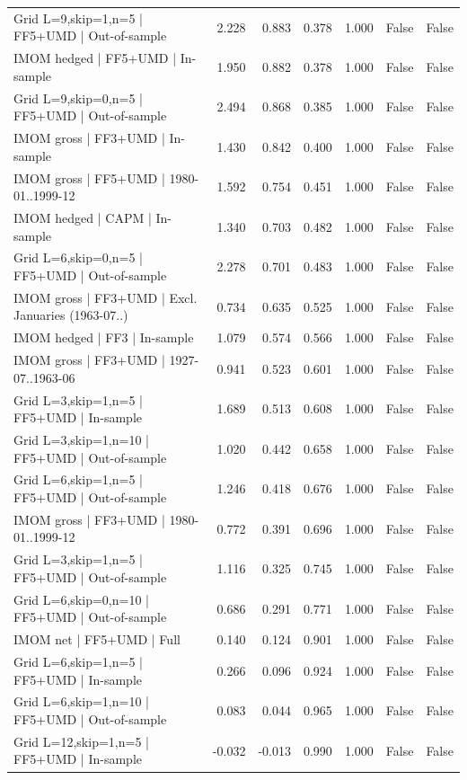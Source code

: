 \begin{tabular}{lrrrrrr}
Grid L=9,skip=1,n=5 | FF5+UMD | Out-of-sample & 2.228 & 0.883 & 0.378 & 1.000 & False & False \\
IMOM hedged | FF5+UMD | In-sample & 1.950 & 0.882 & 0.378 & 1.000 & False & False \\
Grid L=9,skip=0,n=5 | FF5+UMD | Out-of-sample & 2.494 & 0.868 & 0.385 & 1.000 & False & False \\
IMOM gross | FF3+UMD | In-sample & 1.430 & 0.842 & 0.400 & 1.000 & False & False \\
IMOM gross | FF5+UMD | 1980-01..1999-12 & 1.592 & 0.754 & 0.451 & 1.000 & False & False \\
IMOM hedged | CAPM | In-sample & 1.340 & 0.703 & 0.482 & 1.000 & False & False \\
Grid L=6,skip=0,n=5 | FF5+UMD | Out-of-sample & 2.278 & 0.701 & 0.483 & 1.000 & False & False \\
IMOM gross | FF3+UMD | Excl. Januaries (1963-07..) & 0.734 & 0.635 & 0.525 & 1.000 & False & False \\
IMOM hedged | FF3 | In-sample & 1.079 & 0.574 & 0.566 & 1.000 & False & False \\
IMOM gross | FF3+UMD | 1927-07..1963-06 & 0.941 & 0.523 & 0.601 & 1.000 & False & False \\
Grid L=3,skip=1,n=5 | FF5+UMD | In-sample & 1.689 & 0.513 & 0.608 & 1.000 & False & False \\
Grid L=3,skip=1,n=10 | FF5+UMD | Out-of-sample & 1.020 & 0.442 & 0.658 & 1.000 & False & False \\
Grid L=6,skip=1,n=5 | FF5+UMD | Out-of-sample & 1.246 & 0.418 & 0.676 & 1.000 & False & False \\
IMOM gross | FF3+UMD | 1980-01..1999-12 & 0.772 & 0.391 & 0.696 & 1.000 & False & False \\
Grid L=3,skip=1,n=5 | FF5+UMD | Out-of-sample & 1.116 & 0.325 & 0.745 & 1.000 & False & False \\
Grid L=6,skip=0,n=10 | FF5+UMD | Out-of-sample & 0.686 & 0.291 & 0.771 & 1.000 & False & False \\
IMOM net | FF5+UMD | Full & 0.140 & 0.124 & 0.901 & 1.000 & False & False \\
Grid L=6,skip=1,n=5 | FF5+UMD | In-sample & 0.266 & 0.096 & 0.924 & 1.000 & False & False \\
Grid L=6,skip=1,n=10 | FF5+UMD | Out-of-sample & 0.083 & 0.044 & 0.965 & 1.000 & False & False \\
Grid L=12,skip=1,n=5 | FF5+UMD | In-sample & -0.032 & -0.013 & 0.990 & 1.000 & False & False \\

\end{tabular}
